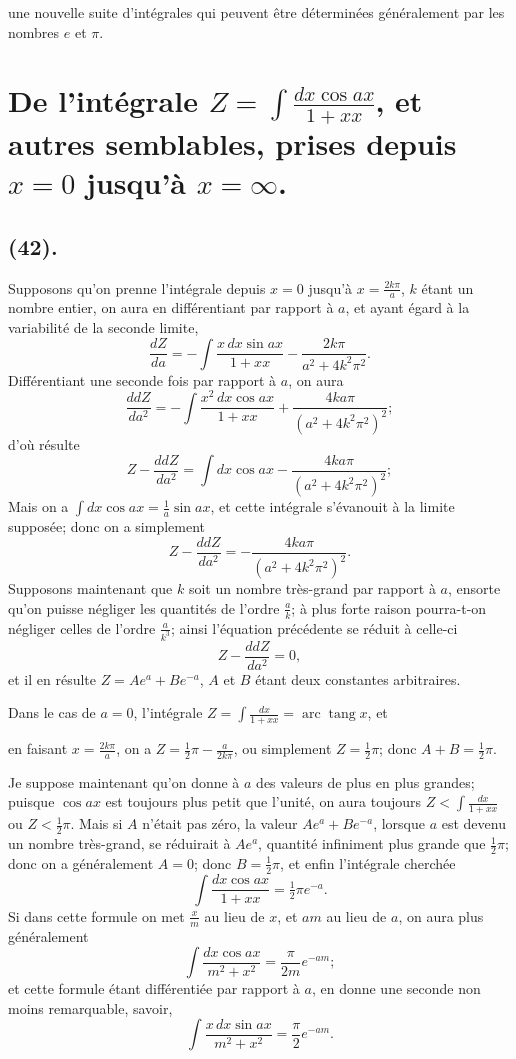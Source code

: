 \documentclass{article}
\begin{document}
une nouvelle suite d'intégrales qui peuvent être déterminées généralement par les nombres $e$ et $\pi$.

\section*{De l'intégrale $Z=\displaystyle\int\frac{dx\cos ax}{1+xx}$, et autres semblables, prises depuis $x=0$ jusqu'à $x=\infty$.}

\subsection*{(42).}

Supposons qu'on prenne l'intégrale depuis $x=0$ jusqu'à $x=\frac{2k\pi}{a}$, $k$ étant un nombre entier, on aura en différentiant par rapport à $a$, et ayant égard à la variabilité de la seconde limite,
\[ \frac{dZ}{da}=-\int\frac{x\,dx\sin ax}{1+xx}-\frac{2k\pi}{a^{2}+4k^{2}\pi^{2}}. \]
Différentiant une seconde fois par rapport à $a$, on aura
\[ \frac{ddZ}{da^{2}}=-\int\frac{x^{2}\,dx\cos ax}{1+xx}+\frac{4ka\pi}{(a^{2}+4k^{2}\pi^{2})^{2}}; \]
d'où résulte
\[ Z-\frac{ddZ}{da^{2}}=\int dx\cos ax-\frac{4ka\pi}{(a^{2}+4k^{2}\pi^{2})^{2}}; \]
Mais on a $\displaystyle\int dx\cos ax=\frac{1}{a}\sin ax$, et cette intégrale s'évanouit à la limite supposée; donc on a simplement
\[ Z-\frac{ddZ}{da^{2}}=-\frac{4ka\pi}{(a^{2}+4k^{2}\pi^{2})^{2}}. \]
Supposons maintenant que $k$ soit un nombre très-grand par rapport à $a$, ensorte qu'on puisse négliger les quantités de l'ordre $\frac{a}{k}$; à plus forte raison pourra-t-on négliger celles de l'ordre $\frac{a}{k^{3}}$; ainsi l'équation précédente se réduit à celle-ci
\[ Z-\frac{ddZ}{da^{2}}=0, \]
et il en résulte $Z=Ae^{a}+Be^{-a}$, $A$ et $B$ étant deux constantes arbitraires.

Dans le cas de $a=0$, l'intégrale $Z=\displaystyle\int\frac{dx}{1+xx}=\operatorname{arc}\operatorname{tang}x$, et

en faisant $x=\frac{2k\pi}{a}$, on a $Z=\frac{1}{2}\pi-\frac{a}{2k\pi}$, ou simplement $Z=\frac{1}{2}\pi$; donc $A+B=\frac{1}{2}\pi$.

Je suppose maintenant qu'on donne à $a$ des valeurs de plus en plus grandes; puisque $\cos ax$ est toujours plus petit que l'unité, on aura toujours $Z<\displaystyle\int\frac{dx}{1+xx}$ ou $Z<\frac{1}{2}\pi$. Mais si $A$ n'était pas zéro, la valeur $Ae^{a}+Be^{-a}$, lorsque $a$ est devenu un nombre très-grand, se réduirait à $Ae^{a}$, quantité infiniment plus grande que $\frac{1}{2}\pi$; donc on a généralement $A=0$; donc $B=\frac{1}{2}\pi$, et enfin l'intégrale cherchée
\[ \int\frac{dx\cos ax}{1+xx}=\tfrac{1}{2}\pi e^{-a}. \]
Si dans cette formule on met $\frac{x}{m}$ au lieu de $x$, et $am$ au lieu de $a$, on aura plus généralement
\[ \int\frac{dx\cos ax}{m^{2}+x^{2}}=\frac{\pi}{2m}e^{-am}; \tag{1} \]
et cette formule étant différentiée par rapport à $a$, en donne une seconde non moins remarquable, savoir,
\[ \int\frac{x\,dx\sin ax}{m^{2}+x^{2}}=\frac{\pi}{2}e^{-am}. \tag{2} \]
\end{document}
